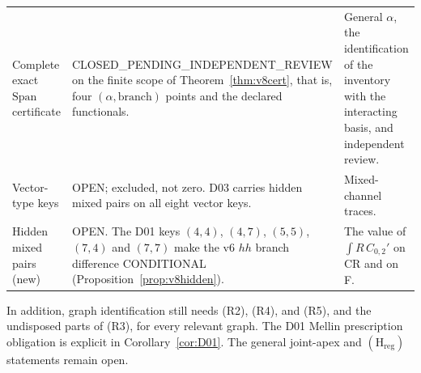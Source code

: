 \documentclass[11pt,a4paper]{article}
\newcommand{\OPEN}{\textsf{OPEN}}
\newcommand{\CONDITIONAL}{\textsf{CONDITIONAL}}
\newcommand{\CPIR}{\textsf{CLOSED\_PENDING\_}\allowbreak\textsf{INDEPENDENT\_REVIEW}}
\newcommand{\Span}{\mathrm{Span}}
\newcommand{\Hreg}{(\mathrm H_{\mathrm{reg}})}
\theoremstyle{plain}
\theoremstyle{definition}
\theoremstyle{remark}
\numberwithin{equation}{section}
\begin{document}
\begin{longtable}{@{}L{.22\linewidth}L{.40\linewidth}L{.31\linewidth}@{}}
Complete exact \(\Span\) certificate &
\CPIR{} on the finite scope of Theorem~\ref{thm:v8cert}, that is,
four \((\alpha,\text{branch})\) points and the declared
functionals. &
General \(\alpha\), the identification of the inventory with the
interacting basis, and independent review.\\

Vector-type keys &
\OPEN; excluded, not zero. D03 carries hidden mixed pairs on all
eight vector keys. &
Mixed-channel traces.\\

Hidden mixed pairs (new) &
\OPEN. The D01 keys \((4,4)\), \((4,7)\), \((5,5)\), \((7,4)\) and
\((7,7)\) make the v6 \(hh\) branch difference \CONDITIONAL{}
(Proposition~\ref{prop:v8hidden}). &
The value of \(\int R\,C_{0,2}'\) on CR and on F.\\
\end{longtable}
\endgroup

In addition, graph identification still needs (R2), (R4), and
(R5), and the undisposed parts of (R3), for every relevant
graph. The D01 Mellin prescription obligation is explicit in
Corollary~\ref{cor:D01}.
The general joint-apex and \(\Hreg\) statements remain open.
\end{document}
